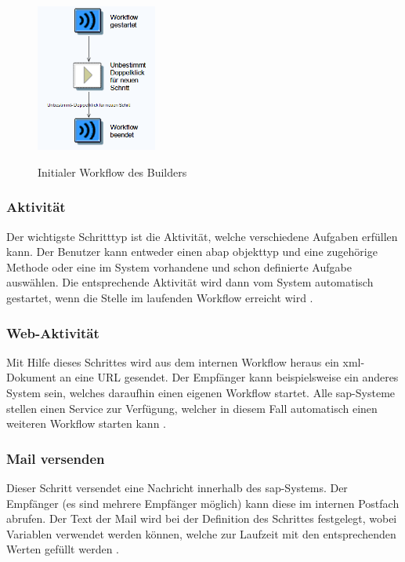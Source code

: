 \begin{figure}[h]
	\begin{center}
	\includegraphics[width=150px]{grafiken/wf-builder_new-wf.png}
	\caption{Initialer Workflow des Builders}
	\vspace{-10pt}
	\label{abb:workflow-easy}
	\end{center}
\end{figure}

\subsubsection{Aktivität}
Der wichtigste Schritttyp ist die Aktivität, welche verschiedene Aufgaben erfüllen kann. Der Benutzer kann entweder einen \gls{abap} \gls{objekttyp} und eine zugehörige Methode oder eine im System vorhandene und schon definierte Aufgabe auswählen. Die entsprechende Aktivität wird dann vom System automatisch gestartet, wenn die Stelle im laufenden Workflow erreicht wird \cite{SAPHelpWf}.

\subsubsection{Web-Aktivität}
Mit Hilfe dieses Schrittes wird aus dem internen Workflow heraus ein \gls{xml}-Dokument an eine URL gesendet. Der Empfänger kann beispielsweise ein anderes System sein, welches daraufhin einen eigenen Workflow startet. Alle \gls{sap}-Systeme stellen einen Service zur Verfügung, welcher in diesem Fall automatisch einen weiteren Workflow starten kann \cite{SAPHelpWf}.

\subsubsection{Mail versenden}
Dieser Schritt versendet eine Nachricht innerhalb des \gls{sap}-Systems. Der Empfänger (es sind mehrere Empfänger möglich) kann diese im internen Postfach abrufen. Der Text der Mail wird bei der Definition des Schrittes festgelegt, wobei Variablen verwendet werden können, welche zur Laufzeit mit den entsprechenden Werten gefüllt werden \cite{SAPHelpWf}.

